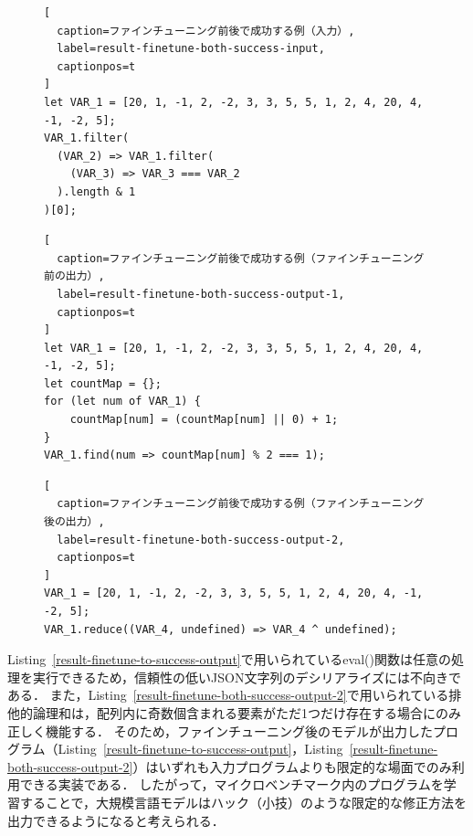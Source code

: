 \documentclass[11pt]{jreport}
\newcommand{\fixtwo}[1]{#1}
\begin{document}
\begin{figure}[t]
\captionsetup{name=Listing}
\hspace{0.04\columnwidth}
\begin{minipage}[b]{0.96\linewidth}
\begin{lstlisting}[
  caption=ファインチューニング前後で成功する例（入力）,
  label=result-finetune-both-success-input,
  captionpos=t
]
let VAR_1 = [20, 1, -1, 2, -2, 3, 3, 5, 5, 1, 2, 4, 20, 4, -1, -2, 5];
VAR_1.filter(
  (VAR_2) => VAR_1.filter(
    (VAR_3) => VAR_3 === VAR_2
  ).length & 1
)[0];
\end{lstlisting}
\end{minipage}

\hspace{0.04\columnwidth}
\begin{minipage}[b]{0.96\linewidth}
\begin{lstlisting}[
  caption=ファインチューニング前後で成功する例（ファインチューニング前の出力）,
  label=result-finetune-both-success-output-1,
  captionpos=t
]
let VAR_1 = [20, 1, -1, 2, -2, 3, 3, 5, 5, 1, 2, 4, 20, 4, -1, -2, 5];
let countMap = {};
for (let num of VAR_1) {
    countMap[num] = (countMap[num] || 0) + 1;
}
VAR_1.find(num => countMap[num] % 2 === 1);
\end{lstlisting}
\end{minipage}

\hspace{0.04\columnwidth}
\begin{minipage}[b]{0.96\linewidth}
\begin{lstlisting}[
  caption=ファインチューニング前後で成功する例（ファインチューニング後の出力）,
  label=result-finetune-both-success-output-2,
  captionpos=t
]
VAR_1 = [20, 1, -1, 2, -2, 3, 3, 5, 5, 1, 2, 4, 20, 4, -1, -2, 5];
VAR_1.reduce((VAR_4, undefined) => VAR_4 ^ undefined);
\end{lstlisting}
\end{minipage}
\end{figure}


\fixtwo{Listing~\ref{result-finetune-to-success-output}で用いられているeval()関数は任意の処理を実行できるため，信頼性の低いJSON文字列のデシリアライズには不向きである．}
\fixtwo{また，Listing~\ref{result-finetune-both-success-output-2}で用いられている排他的論理和は，配列内に奇数個含まれる要素がただ1つだけ存在する場合にのみ正しく機能する．}
\fixtwo{そのため，ファインチューニング後のモデルが出力したプログラム（Listing~\ref{result-finetune-to-success-output}，Listing~\ref{result-finetune-both-success-output-2}）はいずれも入力プログラムよりも限定的な場面でのみ利用できる実装である．}
\fixtwo{したがって，マイクロベンチマーク内のプログラムを学習することで，大規模言語モデルはハック（小技）のような限定的な修正方法を出力できるようになると考えられる．}
\end{document}

